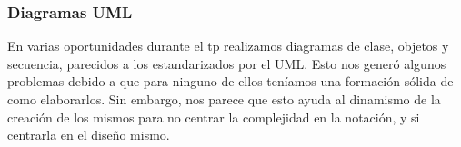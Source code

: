 \subsubsection{Diagramas UML}

En varias oportunidades durante el tp realizamos diagramas de clase, objetos y secuencia, parecidos a los estandarizados por el UML. Esto nos gener\'o algunos problemas debido a que para ninguno de ellos ten\'iamos una formaci\'on s\'olida de como elaborarlos. Sin embargo, nos parece que esto ayuda al dinamismo de la creaci\'on de los mismos para no centrar la complejidad en la notaci\'on, y si centrarla en el diseño mismo.

